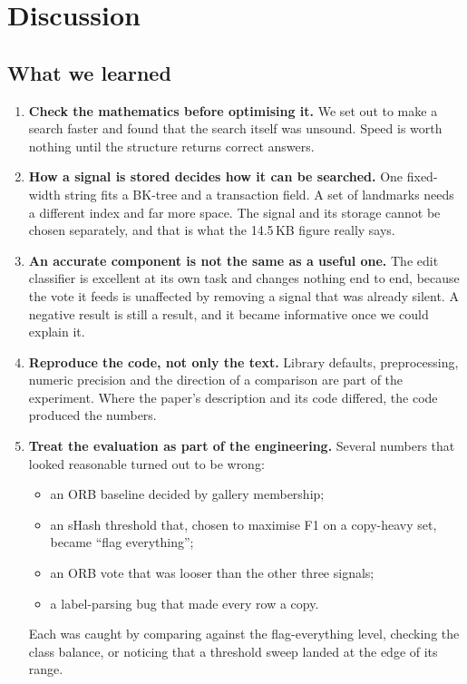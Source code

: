 \section{Discussion}

\subsection{What we learned}

\begin{enumerate}
  \item \textbf{Check the mathematics before optimising it.} We set out to make a search faster
        and found that the search itself was unsound. Speed is worth nothing until the
        structure returns correct answers.
  \item \textbf{How a signal is stored decides how it can be searched.} One fixed-width string
        fits a BK-tree and a transaction field. A set of landmarks needs a different index and far
        more space. The signal and its storage cannot be chosen separately, and that is what the
        14.5\,KB figure really says.
  \item \textbf{An accurate component is not the same as a useful one.} The edit classifier is
        excellent at its own task and changes nothing end to end, because the vote it feeds is
        unaffected by removing a signal that was already silent. A negative result is still a
        result, and it became informative once we could explain it.
  \item \textbf{Reproduce the code, not only the text.} Library defaults, preprocessing,
        numeric precision and the direction of a comparison are part of the experiment. Where
        the paper's description and its code differed, the code produced the numbers.
  \item \textbf{Treat the evaluation as part of the engineering.} Several numbers that looked
        reasonable turned out to be wrong:
        \begin{itemize}
          \item an ORB baseline decided by gallery membership;
          \item an sHash threshold that, chosen to maximise F1 on a copy-heavy set, became
                ``flag everything'';
          \item an ORB vote that was looser than the other three signals;
          \item a label-parsing bug that made every row a copy.
        \end{itemize}
        Each was caught by comparing against the flag-everything level, checking the class
        balance, or noticing that a threshold sweep landed at the edge of its range.
\end{enumerate}

